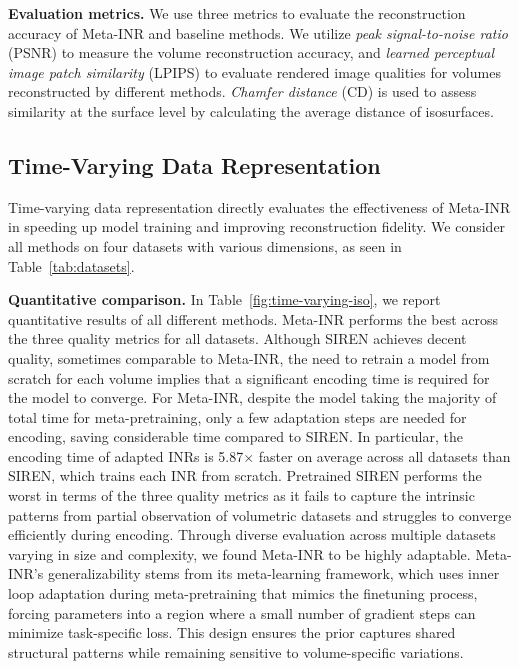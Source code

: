 {\bf Evaluation metrics.}
We use three metrics to evaluate the reconstruction accuracy of Meta-INR and baseline methods. 
We utilize \textit{peak signal-to-noise ratio} (PSNR) to measure the volume reconstruction accuracy, and \textit{learned perceptual image patch similarity} (LPIPS) to evaluate rendered image qualities for volumes reconstructed by different methods. \textit{Chamfer distance} (CD) is used to assess similarity at the surface level by calculating the average distance of isosurfaces. 

\vspace{-0.05in}
\subsection{Time-Varying Data Representation}
\label{subsec:tvdr}

Time-varying data representation directly evaluates the effectiveness of Meta-INR in speeding up model training and improving reconstruction fidelity. We consider all methods on four datasets with various dimensions, as seen in Table~\ref{tab:datasets}. 

{\bf Quantitative comparison.}
In Table~\ref{fig:time-varying-iso}, we report quantitative results of all different methods. 
Meta-INR performs the best across the three quality metrics for all datasets. 
Although SIREN achieves decent quality, sometimes comparable to Meta-INR, the need to retrain a model from scratch for each volume implies that a significant encoding time is required for the model to converge. 
For Meta-INR, despite the model taking the majority of total time for meta-pretraining, only a few adaptation steps are needed for encoding, saving considerable time compared to SIREN.
In particular, the encoding time of adapted INRs is 5.87$\times$ faster on average across all datasets than SIREN, which trains each INR from scratch. 
Pretrained SIREN performs the worst in terms of the three quality metrics as it fails to capture the intrinsic patterns from partial observation of volumetric datasets and struggles to converge efficiently during encoding.
Through diverse evaluation across multiple datasets varying in size and complexity, we found Meta-INR to be highly adaptable. Meta-INR's generalizability stems from its meta-learning framework, which uses inner loop adaptation during meta-pretraining that mimics the finetuning process, forcing parameters into a region where a small number of gradient steps can minimize task-specific loss. This design ensures the prior captures shared structural patterns while remaining sensitive to volume-specific variations. 


